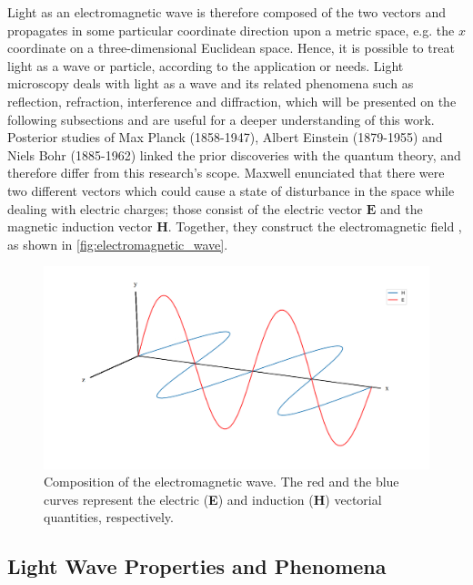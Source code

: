 Light as an electromagnetic wave is therefore composed of the two vectors and propagates in some particular coordinate direction upon a metric space, e.g. the $\mathit{x}$ coordinate on a three-dimensional Euclidean space. Hence, it is possible to treat light as a wave or particle, according to the application or needs. Light microscopy deals with light as a wave and its related phenomena such as reflection, refraction, interference and diffraction, which will be presented on the following subsections and are useful for a deeper understanding of this work. Posterior studies of Max Planck (1858-1947), Albert Einstein (1879-1955) and Niels Bohr (1885-1962) \cite{fowles1989introduction} linked the prior discoveries with the quantum theory, and therefore differ from this research's scope. Maxwell enunciated that there were two different vectors which could cause a state of disturbance in the space while dealing with electric charges; those consist of the electric vector $\mathit{\mathbf{E}}$ and the magnetic induction vector $\mathit{\mathbf{H}}$. Together, they construct the electromagnetic field \cite{born1999principles}, as shown in \autoref{fig:electromagnetic_wave}.

\begin{figure}[htb]
	\centering
	\caption{\label{fig:electromagnetic_wave} 
		Composition of the electromagnetic wave. The red and the blue curves represent the electric (\textbf{E}) and induction (\textbf{H}) vectorial quantities, respectively.}
	\begin{center}
	    \includegraphics[scale=0.3]
			{images/fig2.png}
	\end{center}
	\centering
	\fautor
\end{figure}

\subsection{Light Wave Properties and Phenomena}

